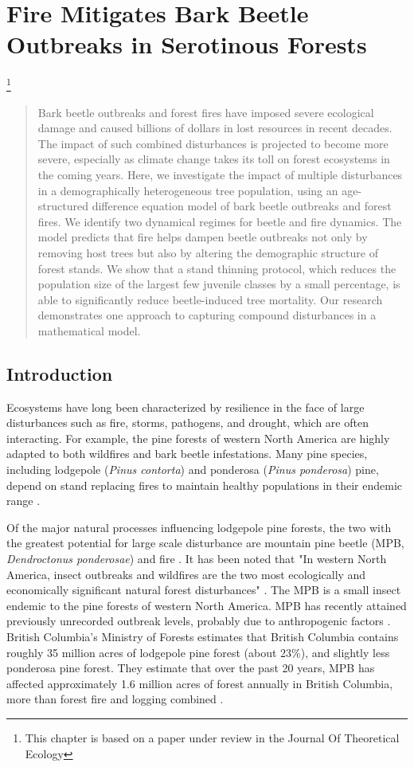 \chapter{Fire Mitigates Bark Beetle Outbreaks in Serotinous Forests }
\label{ch3}
\let\thefootnote\relax\footnote{This chapter is based on a paper under review in the Journal Of Theoretical Ecology}
\begin{abstract}
Bark beetle outbreaks and forest fires have imposed severe ecological damage and caused billions of dollars in lost resources in recent decades. The impact of such combined disturbances is projected to become more severe, especially as climate change takes its toll on forest ecosystems in the coming years. Here, we investigate the impact of multiple disturbances in a demographically heterogeneous tree population, using an age-structured difference equation model of bark beetle outbreaks and forest fires. We identify two dynamical regimes for beetle and fire dynamics. The model predicts that fire helps dampen beetle outbreaks not only by removing host trees but also by altering the demographic structure of forest stands. We show that a stand thinning protocol, which reduces the population size of the largest few juvenile classes by a small percentage, is able to significantly reduce beetle-induced tree mortality.  Our research demonstrates one approach to capturing compound disturbances in a mathematical model.
\end{abstract}

\section{Introduction}

Ecosystems have long been characterized by resilience in the face of large disturbances such as fire, storms, pathogens, and drought, which are often interacting. For example, the pine forests of western North America are highly adapted to both wildfires and bark beetle infestations. Many pine species, including lodgepole (\textit{Pinus contorta}) and ponderosa (\textit{Pinus ponderosa}) pine, depend on stand replacing fires to maintain healthy populations in their endemic range \cite{bentz2010climate}. 

Of the major natural processes influencing lodgepole pine forests, the two with the greatest potential for large scale disturbance are mountain pine beetle (MPB, \textit{Dendroctonus ponderosae}) and fire \cite{kaufmann2008status}. It has been noted that "In western North America, insect outbreaks and wildfires are the two most ecologically and economically significant natural forest disturbances" \cite{meigs2016insect}. The MPB is a small insect endemic to the pine forests of western North America. MPB has recently attained previously unrecorded outbreak levels, probably due to anthropogenic factors \cite{bentz2010climate,safranyik2007mountain}.  British Columbia's Ministry of Forests estimates that British Columbia contains roughly 35 million acres of lodgepole pine forest (about 23\%), and slightly less ponderosa pine forest. They estimate that over the past 20 years, MPB has affected approximately 1.6 million acres of forest annually in British Columbia, more than forest fire and logging combined \cite{bc2010state}.

